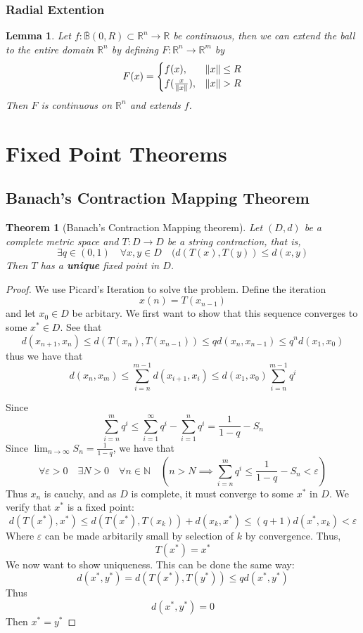 \documentclass[a4paper, 12pt]{book}
\newtheorem{theorem}{Theorem}[chapter]
\newtheorem{lemma}{Lemma}[chapter]
\begin{document}
\subsubsection{Radial Extention}
\begin{lemma}
	Let \( f: \overline{\mathbb{B}}(0,R)\subset \mathbb{R}^n \to \mathbb{R} \) be continuous, then we can extend the ball to the entire domain \( \mathbb{R}^n \) by defining \( F:\mathbb{R}^n\to \mathbb{R}^m \) by \[
		F(x) =
		\begin{cases}
			f(x),                       & \norm{x} \leq R \\
			f(\frac{ x }{ \norm{x}  }), & \norm{x} >R
		\end{cases}
	\]
	Then \( F \) is continuous on \( \mathbb{R}^n \) and extends \( f \).
\end{lemma}
\section{Fixed Point Theorems}
\subsection{Banach's Contraction Mapping Theorem}
\begin{theorem}[Banach's Contraction Mapping theorem]
	Let \( (D,d) \) be a complete metric space and \( T:D\to D \) be a string contraction, that is, \[
		\exists q\in (0,1) \quad \forall x,y\in D \quad (d(T(x),T(y))\leq d(x,y)
	\]
	Then \( T \) has a \textbf{unique} fixed point in \( D \).
\end{theorem}
\begin{proof}
	We use Picard's Iteration to solve the problem. Define the iteration
	\[
		x(n)=T(x_{n-1} )
	\]
	and let \( x_0\in D \) be arbitary. We first want to show that this sequence converges to some \( x^* \in D \).
	See that \[
		d(x_{n+1} , x_n)\leq d(T(x_n), T(x_{n-1} ))\leq q d(x_n,x_{n-1})\leq q^nd(x_1,x_0)
	\]
	thus we have that \[
		d(x_n,x_m)\leq \sum_{i=n}^{m-1} d(x_{i+1}, x_i)\leq d(x_1,x_0)\sum_{i=n}^{m-1} q^i
	\]

	Since \[
		\sum_{i=n}^{m} q^i\leq \sum_{i=1}^{\infty} q^i-\sum_{i=1}^{n} q^i= \frac{ 1 }{ 1-q } - S_n
	\]
	Since \( \lim_{n \to \infty} S_n=\frac{ 1 }{ 1-q }  \), we have that \[
		\forall \varepsilon>0 \quad \exists N>0 \quad \forall n \in \mathbb{N} \quad (n>N \implies \sum_{i=n}^{m} q^i \leq \frac{ 1 }{ 1-q } -S_n <\varepsilon)
	\]
	Thus \( x_n \) is cauchy, and as \( D \) is complete, it must converge to some \( x^* \) in \( D \). We verify that \( x^* \) is a fixed point: \[
		d(T(x^*), x^*)\leq d(T(x^*),T(x_k))+d(x_k, x^*)\leq (q+1)d(x^*,x_k)<\varepsilon
	\]
	Where \( \varepsilon \) can be made arbitarily small by selection of \( k \) by convergence. Thus, \[
		T(x^*)=x^*
	\]
	We now want to show uniqueness. This can be done the same way:
	\[
		d(x^*,y^*)=d(T(x^*),T(y^*))\leq qd(x^*,y^*)
	\]
	Thus \[
		d(x^*,y^*)=0
	\]
	Then \( x^*=y^* \)
\end{proof}
\end{document}

